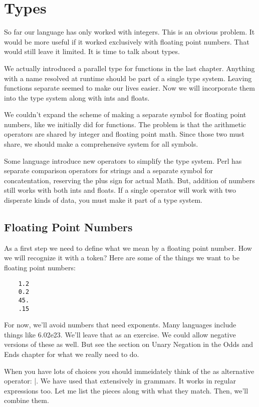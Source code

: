 \chapter{Types}

So far our language has only worked with integers. This is
an obvious problem. It would be more useful if it worked
exclusively with floating point numbers. That would still
leave it limited. It is time to talk about types.

We actually introduced a parallel type for functions in
the last chapter. Anything with a name resolved at runtime
should be part of a single type system. Leaving functions separate
seemed to make our lives easier. Now we will incorporate
them into the type system along with ints and floats.

We couldn't expand the scheme of making a separate symbol
for floating point numbers, like we initially did for functions.
The problem is that the arithmetic operators
are shared by integer and floating point math. Since
those two must share, we should make a comprehensive
system for all symbols.

Some language introduce new operators to simplify the type
system. Perl has separate comparison operators for strings
and a separate symbol for concatentation, reserving the
plus sign for actual Math. But, addition of numbers still
works with both ints and floats.
If a single operator will work with two disperate kinds
of data, you must make it part of a type system.

\section{Floating Point Numbers}

As a first step we need to define what we mean by a floating
point number. How we will recognize it with a token?
Here are some of the things we want to be floating point numbers:

{\footnotesize
\begin{verbatim}
    1.2
    0.2
    45.
    .15
\end{verbatim}
}

For now, we'll avoid numbers that need exponents. Many languages
include things like 6.02e23. We'll leave that as an exercise.
We could allow negative versions of these as well. But see
the section on Unary Negation in the Odds and Ends chapter
for what we really need to do.

When you have lots of choices you should immeidately think
of the as alternative operator: |. We have used that
extensively in grammars. It works in regular expressions too.
Let me list the pieces along with what they match. Then,
we'll combine them.

